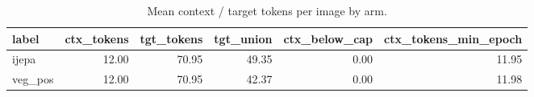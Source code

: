 \begin{table}[t]
\centering
\small
\caption{Mean context / target tokens per image by arm.}
\label{tab:token_budget}
\begin{tabular}{lrrrrr}
\toprule
label & ctx\_tokens & tgt\_tokens & tgt\_union & ctx\_below\_cap & ctx\_tokens\_min\_epoch \\
\midrule
ijepa & 12.00 & 70.95 & 49.35 & 0.00 & 11.95 \\
veg\_pos & 12.00 & 70.95 & 42.37 & 0.00 & 11.98 \\
\bottomrule
\end{tabular}
\end{table}
